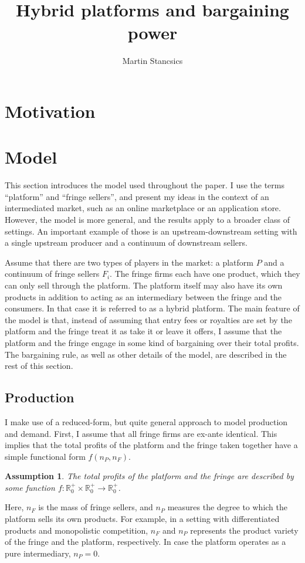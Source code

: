 \documentclass[a4paper]{article}
\title{Hybrid platforms and bargaining power}
\author{Martin Stancsics}
\newtheorem{assumption}{Assumption}
\begin{document}
\maketitle

\begin{abstract}
\end{abstract}


\section{Motivation}


\section{Model}
\label{sec:model}

This section introduces the model used throughout the paper.
I use the terms ``platform'' and ``fringe sellers'', and present my ideas in the context of an intermediated market, such as an online marketplace or an application store.
However, the model is more general, and the results apply to a broader class of settings.
An important example of those is an upstream-downstream setting with a single upstream producer and a continuum of downstream sellers.

Assume that there are two types of players in the market: a platform $P$ and a continuum of fringe sellers $F_i$.
The fringe firms each have one product, which they can only sell through the platform.
The platform itself may also have its own products in addition to acting as an intermediary between the fringe and the consumers.
In that case it is referred to as a hybrid platform.
The main feature of the model is that, instead of assuming that entry fees or royalties are set by the platform and the fringe treat it as take it or leave it offers, I assume that the platform and the fringe engage in some kind of bargaining over their total profits.
The bargaining rule, as well as other details of the model, are described in the rest of this section.


\subsection{Production}

I make use of a reduced-form, but quite general approach to model production and demand.
First, I assume that all fringe firms are ex-ante identical.
This implies that the total profits of the platform and the fringe taken together have a simple functional form $f(n_P, n_F)$.
\begin{assumption}
    \label{ass:identical_fringe}
    The total profits of the platform and the fringe are described by some function $f: \mathbb{R}^+_0 \times \mathbb{R}^+_0 \to \mathbb{R}^+_0$.
\end{assumption}
Here, $n_F$ is the mass of fringe sellers, and $n_P$ measures the degree to which the platform sells its own products.
For example, in a setting with differentiated products and monopolistic competition, $n_F$ and $n_P$ represents the product variety of the fringe and the platform, respectively.
In case the platform operates as a pure intermediary, $n_P = 0$.
\end{document}
